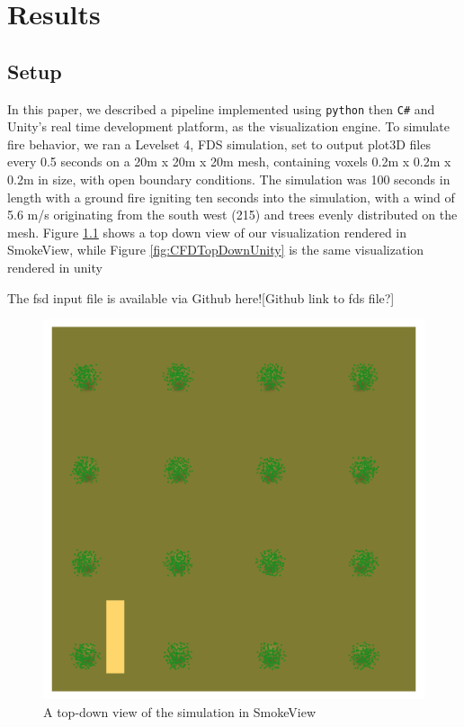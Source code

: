 
\chapter{Results} %

\label{Chapter3} %

\section{Setup}
In this paper, we described a pipeline implemented using \texttt{python} then \texttt{C\#} and Unity’s real time development platform, as the visualization engine. To simulate fire behavior, we ran a Levelset 4, FDS simulation, set to output plot3D files every 0.5 seconds on a 20m x 20m x 20m mesh, containing voxels 0.2m x 0.2m x 0.2m in size, with open boundary conditions. The simulation was 100 seconds in length with a ground fire igniting ten seconds into the simulation, with a wind of 5.6 m/s originating from the south west (215\textdegree) and trees evenly distributed on the mesh.  Figure \ref{fig:CFDTopDownSmokeview} shows a top down view of our visualization rendered in SmokeView, while Figure  \ref{fig:CFDTopDownUnity} is the same visualization rendered in unity \par
The fsd input file is available via Github here![Github link to fds file?]\par
\begin{figure}
\centering
\includegraphics[scale=.3]{Figures/TopDownSMV.png}
\decoRule
\caption[Top Down SmokeView View]{A top-down view of the simulation in SmokeView }
\label{fig:CFDTopDownSmokeview}
\end{figure}
